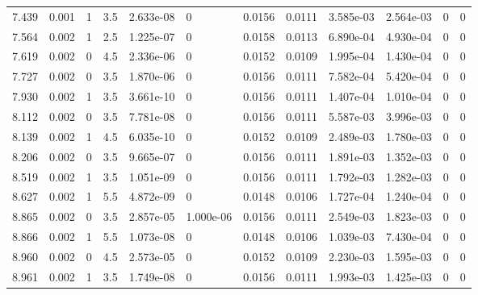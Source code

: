 \documentclass[preview]{standalone}
\begin{document}
{{{\begin{tabular}{L{1.2cm}C{1.2cm} C{0.3cm}C{0.5cm} C{1.4cm}C{1.4cm} C{1.4cm}C{1.4cm} C{1.6cm}C{1.6cm} C{1.6cm}C{1.6cm}}
  7.439  &  0.001  & 1     & 3.5 &  2.633e-08  & 0  &  0.0156&   0.0111& 3.585e-03 & 2.564e-03   &  0 & 0  \\ 
  7.564  &  0.002  & 1     & 2.5 &  1.225e-07  & 0  &  0.0158&   0.0113& 6.890e-04 & 4.930e-04   &  0 & 0  \\ 
  7.619  &  0.002  & 0     & 4.5 &  2.336e-06  & 0  &  0.0152&   0.0109& 1.995e-04 & 1.430e-04   &  0 & 0  \\ 
  7.727  &  0.002  & 0     & 3.5 &  1.870e-06  & 0  &  0.0156&   0.0111& 7.582e-04 & 5.420e-04   &  0 & 0  \\ 
  7.930  &  0.002  & 1     & 3.5 &  3.661e-10  & 0  &  0.0156&   0.0111& 1.407e-04 & 1.010e-04   &  0 & 0  \\ 
  8.112  &  0.002  & 0     & 3.5 &  7.781e-08  & 0  &  0.0156&   0.0111& 5.587e-03 & 3.996e-03   &  0 & 0  \\ 
  8.139  &  0.002  & 1     & 4.5 &  6.035e-10  & 0  &  0.0152&   0.0109& 2.489e-03 & 1.780e-03   &  0 & 0  \\ 
  8.206  &  0.002  & 0     & 3.5 &  9.665e-07  & 0  &  0.0156&   0.0111& 1.891e-03 & 1.352e-03   &  0 & 0  \\ 
  8.519  &  0.002  & 1     & 3.5 &  1.051e-09  & 0  &  0.0156&   0.0111& 1.792e-03 & 1.282e-03   &  0 & 0  \\ 
  8.627  &  0.002  & 1     & 5.5 &  4.872e-09  & 0  &  0.0148&   0.0106& 1.727e-04 & 1.240e-04   &  0 & 0  \\ 
  8.865  &  0.002  & 0     & 3.5 &  2.857e-05  & 1.000e-06  &  0.0156&   0.0111& 2.549e-03 & 1.823e-03   &  0 & 0  \\ 
  8.866  &  0.002  & 1     & 5.5 &  1.073e-08  & 0  &  0.0148&   0.0106& 1.039e-03 & 7.430e-04   &  0 & 0  \\ 
  8.960  &  0.002  & 0     & 4.5 &  2.573e-05  & 0  &  0.0152&   0.0109& 2.230e-03 & 1.595e-03   &  0 & 0  \\ 
  8.961  &  0.002  & 1     & 3.5 &  1.749e-08  & 0  &  0.0156&   0.0111& 1.993e-03 & 1.425e-03   &  0 & 0  \\ 
\hline 
\end{tabular} 

}}}
\end{document}

